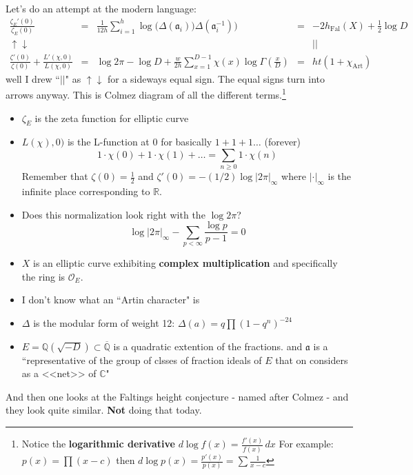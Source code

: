 \documentclass[12pt]{article}
\begin{document}
\noindent Let's do an attempt at the modern language:
\Large
$$
\begin{array}{ccccc}
\frac{\zeta_E'(0)}{\zeta_E(0)} &=& \frac{1}{12h}\sum_{i=1}^h \log \big( \Delta(\mathfrak{a}_i)\big)
\Delta(\mathfrak{a}_i^{-1})\big)&=&-2h_{\text{Fal}}(X) + \frac{1}{2} \log D \\ 
\uparrow \downarrow & & & & || \\
\frac{\zeta'(0)}{\zeta(0)}
+ \frac{L'(\chi, 0)}{L(\chi, 0)} &=&
\log 2\pi - \log D + \frac{w}{2h}\sum_{x=1}^{D-1} \chi(x) \log \Gamma(\frac{x}{D})&=& ht(1 + \chi_\text{Art})
\end{array}
 $$
well I drew ``$||$" as $\uparrow \downarrow$ for a sideways equal sign.  The equal signs turn into arrows anyway.  This is Colmez diagram of all the different terms.\footnote{Notice the \textbf{logarithmic derivative} $d \log f(x) = \frac{f'(x)}{f(x)}\, dx$ For example: $p(x) = \prod(x - c)$ then $d \log p(x) = \frac{p'(x)}{p(x)}=\sum \frac{1}{x-c} $}
\begin{itemize}
\item $\zeta_E$ is the zeta function for elliptic curve
\item $L(\chi), 0)$ is the L-function at $0$ for basically $1+1+1\dots$ (forever) $$1\cdot \chi(0) + 1 \cdot \chi(1) + \dots = \sum_{n \geq 0} 1 \cdot \chi(n)$$
Remember that $\zeta(0) = \frac{1}{2}$ and $\zeta'(0) = - (1/2) \log |2\pi|_\infty$ where $|\cdot|_\infty$ is the infinite place corresponding to $\mathbb{R}$.
\item Does this normalization look right with the $\log 2\pi$? 
$$ \log |2\pi|_\infty - \sum_{p < \infty} \frac{\log p}{p-1} = 0 $$
\item $X$ is an elliptic curve exhibiting \textbf{complex multiplication} and specifically the ring is $\mathcal{O}_E$.
\item I don't know what an ``Artin character" is
\item $\Delta$ is the modular form of weight 12: $\Delta(a) = q\prod (1-q^n)^{-24}$
\item $E = \mathbb{Q}(\sqrt{-D}) \subset \overline{\mathbb{Q}}$ is a quadratic extention of the fractions. and $\mathfrak{a}$ is a ``representative of the group of clsses of fraction ideals of $E$ that on considers as a <<net>> of $\mathbb{C}$"
\end{itemize}
And then one looks at the Faltings height conjecture - named after Colmez - and they look quite similar. \textbf{Not} doing that today.

\newpage
\end{document}

